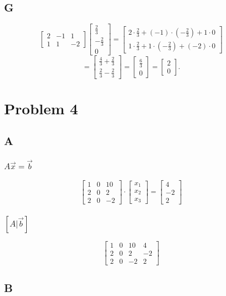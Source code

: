 \documentclass{article}
\begin{document}
\subsection*{G}

\[
	\begin{bmatrix}
		2 & -1 & 1  \\
		1 & 1  & -2
	\end{bmatrix}
	\begin{bmatrix}
		\frac{2}{3}  \\
		-\frac{2}{3} \\
		0
	\end{bmatrix}
	=
	\begin{bmatrix}
		2\cdot\frac{2}{3} + (-1)\cdot\left(-\frac{2}{3}\right) + 1\cdot 0 \\
		1\cdot\frac{2}{3} + 1\cdot\left(-\frac{2}{3}\right) + (-2)\cdot 0
	\end{bmatrix}
\]
\[
	=\begin{bmatrix}
		\frac{4}{3} + \frac{2}{3} \\
		\frac{2}{3} - \frac{2}{3}
	\end{bmatrix}
	=\begin{bmatrix}
		\frac{6}{3} \\
		0
	\end{bmatrix}
	=\begin{bmatrix}
		2 \\
		0
	\end{bmatrix}.
\]

\section*{Problem 4}

\subsection*{A}
\subsubsection*{$A\vec{x}=\vec{b}$}
\[
	\begin{bmatrix}
		1 & 0 & 10 \\
		2 & 0 & 2  \\
		2 & 0 & -2
	\end{bmatrix}
	\cdot
	\begin{bmatrix}
		x_1 \\
		x_2 \\
		x_3
	\end{bmatrix}
	=
	\begin{bmatrix}
		4 \\-2\\2
	\end{bmatrix}
\]

\subsubsection*{$[A | \vec{b} ]$}

\[
	\begin{bmatrix}
		1 & 0 & 10 & 4 \\2&0&2&-2\\2&0&-2&2
	\end{bmatrix}
\]

\subsection*{B}
\end{document}
